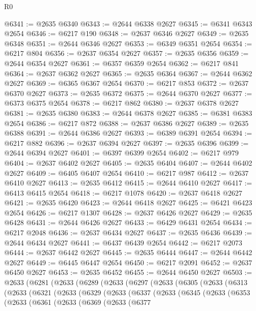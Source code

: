 \begin{lexlean}{R0}
\begin{coremodule}
@6341 := @2635 @6340
@6343 := @2644 @6338 @2627
@6345 := @6341 @6343 @2654
@6346 := @6217 @190
@6348 := @2637 @6346 @2627
@6349 := @2635 @6348
@6351 := @2644 @6346 @2627
@6353 := @6349 @6351 @2654
@6354 := @6217 @804
@6356 := @2637 @6354 @2627
@6357 := @2635 @6356
@6359 := @2644 @6354 @2627
@6361 := @6357 @6359 @2654
@6362 := @6217 @841
@6364 := @2637 @6362 @2627
@6365 := @2635 @6364
@6367 := @2644 @6362 @2627
@6369 := @6365 @6367 @2654
@6370 := @6217 @853
@6372 := @2637 @6370 @2627
@6373 := @2635 @6372
@6375 := @2644 @6370 @2627
@6377 := @6373 @6375 @2654
@6378 := @6217 @862
@6380 := @2637 @6378 @2627
@6381 := @2635 @6380
@6383 := @2644 @6378 @2627
@6385 := @6381 @6383 @2654
@6386 := @6217 @872
@6388 := @2637 @6386 @2627
@6389 := @2635 @6388
@6391 := @2644 @6386 @2627
@6393 := @6389 @6391 @2654
@6394 := @6217 @882
@6396 := @2637 @6394 @2627
@6397 := @2635 @6396
@6399 := @2644 @6394 @2627
@6401 := @6397 @6399 @2654
@6402 := @6217 @979
@6404 := @2637 @6402 @2627
@6405 := @2635 @6404
@6407 := @2644 @6402 @2627
@6409 := @6405 @6407 @2654
@6410 := @6217 @987
@6412 := @2637 @6410 @2627
@6413 := @2635 @6412
@6415 := @2644 @6410 @2627
@6417 := @6413 @6415 @2654
@6418 := @6217 @1078
@6420 := @2637 @6418 @2627
@6421 := @2635 @6420
@6423 := @2644 @6418 @2627
@6425 := @6421 @6423 @2654
@6426 := @6217 @1307
@6428 := @2637 @6426 @2627
@6429 := @2635 @6428
@6431 := @2644 @6426 @2627
@6433 := @6429 @6431 @2654
@6434 := @6217 @2048
@6436 := @2637 @6434 @2627
@6437 := @2635 @6436
@6439 := @2644 @6434 @2627
@6441 := @6437 @6439 @2654
@6442 := @6217 @2073
@6444 := @2637 @6442 @2627
@6445 := @2635 @6444
@6447 := @2644 @6442 @2627
@6449 := @6445 @6447 @2654
@6450 := @6217 @2091
@6452 := @2637 @6450 @2627
@6453 := @2635 @6452
@6455 := @2644 @6450 @2627
@6503 := @2633
    (@6281
      (@2633
        (@6289
          (@2633
            (@6297
              (@2633
                (@6305
                  (@2633
                    (@6313
                      (@2633
                        (@6321
                          (@2633
                            (@6329
                              (@2633
                                (@6337
                                  (@2633
                                    (@6345
                                      (@2633
                                        (@6353
                                          (@2633
                                            (@6361
                                              (@2633
                                                (@6369
                                                  (@2633
                                                    (@6377

\end{coremodule}
\end{lexlean}
